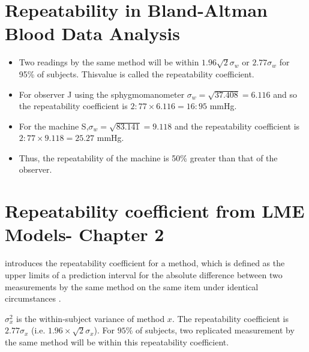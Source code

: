 \documentclass[12pt, a4paper]{report}
\theoremstyle{plain}
\theoremstyle{definition}
\theoremstyle{remark}
\begin{document}
	\section{Repeatability in Bland-Altman Blood Data Analysis}
	\begin{itemize}
		\item Two readings by the same method will be within $1.96
		\sqrt{2} \sigma_w $ or $2.77 \sigma_w $ for 95\% of subjects. Thisvalue is called the repeatability coefficient.
		
		\item For observer J using the sphygmomanometer $ \sigma_w = \sqrt{37.408} = 6.116$ and so the repeatability coefficient is
		$2:77 \times 6.116 = 16:95$ mmHg.
		
		\item For the machine S,$ \sigma_w = \sqrt{83.141} = 9.118$ and the repeatability coefficient is $2:77 \times 9.118 = 25.27$ mmHg.
		
		\item Thus, the repeatability of the machine is 50\% greater than that of the observer.
	\end{itemize}
		\section{Repeatability coefficient from LME Models- Chapter 2}
		\citet{BA99} introduces the repeatability coefficient for a method, which is defined as the upper limits of a prediction interval for the absolute difference between two measurements by the same
		method on the same item under identical circumstances \citep{BXC2008}.
		
		$\sigma^2_{x}$ is the within-subject variance of method $x$. The repeatability coefficient is $2.77 \sigma_{x}$ (i.e. $1.96 \times \sqrt{2} \sigma_{x}$). For $95\%$ of subjects, two replicated measurement by the same method will be within this repeatability coefficient.
		
		
		
		
\end{document}
